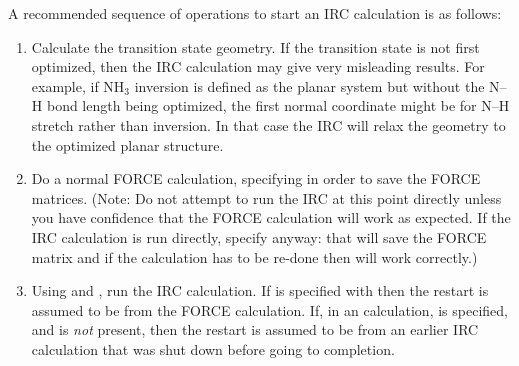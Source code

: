 A recommended sequence of operations to start an IRC calculation is
as follows:
\begin{enumerate}
\item Calculate the transition state geometry.  If  the  transition state  is
not first  optimized,  then  the  IRC  calculation  may  give  very misleading
results.  For example, if NH$_3$ inversion  is  defined as  the  planar
system  but  without the N--H bond length being optimized, the first normal
coordinate might be for N--H  stretch rather  than  inversion.   In  that case
the IRC will relax the geometry to the optimized planar structure.

\item Do a normal FORCE calculation, specifying  in  order  to
save  the  FORCE  matrices.   (Note: Do  not  attempt  to  run the IRC at this
point directly unless you have confidence that  the FORCE  calculation will
work as expected.  If the IRC calculation is run directly, specify
 anyway:  that will save the FORCE matrix and if the
calculation  has  to  be  re-done  then   will work correctly.)

\item Using  and , run the IRC calculation.   If
 is specified with  then the restart is assumed to
be from the FORCE calculation.  If, in an  calculation,
  is specified, and  is {\em not} present,  then
the restart is  assumed to be from an earlier IRC calculation that was  shut
down  before  going  to completion.
\end{enumerate}

